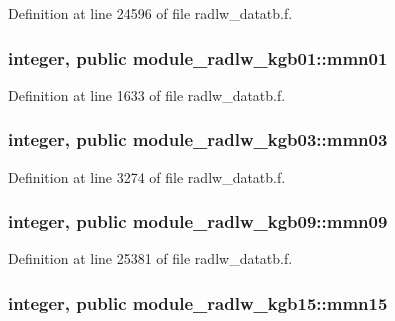 Definition at line 24596 of file radlw\+\_\+datatb.\+f.

\subsubsection[{\texorpdfstring{mmn01}{mmn01}}]{\setlength{\rightskip}{0pt plus 5cm}integer, public module\+\_\+radlw\+\_\+kgb01\+::mmn01}\hypertarget{group__module__radlw__main_ga218c6844f9043f362571f091a4f80522}{}\label{group__module__radlw__main_ga218c6844f9043f362571f091a4f80522}


Definition at line 1633 of file radlw\+\_\+datatb.\+f.

\subsubsection[{\texorpdfstring{mmn03}{mmn03}}]{\setlength{\rightskip}{0pt plus 5cm}integer, public module\+\_\+radlw\+\_\+kgb03\+::mmn03}\hypertarget{group__module__radlw__main_gab4e84b10460930267256c0e5a1fe7a55}{}\label{group__module__radlw__main_gab4e84b10460930267256c0e5a1fe7a55}


Definition at line 3274 of file radlw\+\_\+datatb.\+f.

\subsubsection[{\texorpdfstring{mmn09}{mmn09}}]{\setlength{\rightskip}{0pt plus 5cm}integer, public module\+\_\+radlw\+\_\+kgb09\+::mmn09}\hypertarget{group__module__radlw__main_gaa9c8294b56ac3ce90b07114e986777a9}{}\label{group__module__radlw__main_gaa9c8294b56ac3ce90b07114e986777a9}


Definition at line 25381 of file radlw\+\_\+datatb.\+f.

\subsubsection[{\texorpdfstring{mmn15}{mmn15}}]{\setlength{\rightskip}{0pt plus 5cm}integer, public module\+\_\+radlw\+\_\+kgb15\+::mmn15}\hypertarget{group__module__radlw__main_ga8ab45999cfc7b9db0f3d3b61ccf803e8}{}\label{group__module__radlw__main_ga8ab45999cfc7b9db0f3d3b61ccf803e8}


